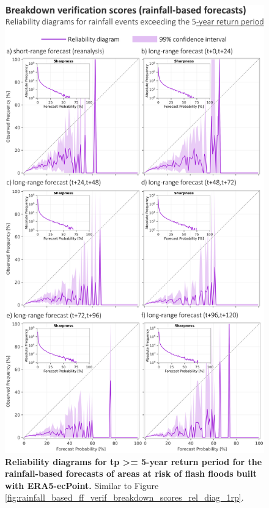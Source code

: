 \begin{figure}[htbp]
\centering
\includegraphics[width=\textwidth]{rainfall_based_ff_verif_breakdown_scores_rel_diag_5rp.png}
\caption{\textbf{Reliability diagrams for tp >= 5-year return period for the rainfall-based forecasts of areas at risk of flash floods built with ERA5-ecPoint.} Similar to Figure \ref{fig:rainfall_based_ff_verif_breakdown_scores_rel_diag_1rp}.}
\label{fig:rainfall_based_ff_verif_breakdown_scores_rel_diag_5rp}
\end{figure}

